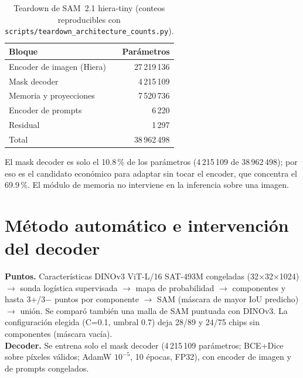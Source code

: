\documentclass[conference]{IEEEtran}
\begin{document}
\begin{table}[!t]\centering\footnotesize\caption{Teardown de SAM~2.1 hiera-tiny (conteos reproducibles con \texttt{scripts/teardown\_architecture\_counts.py}).}
\begin{tabular}{@{}lr@{}}\toprule
Bloque & Par\'ametros\\\midrule
Encoder de imagen (Hiera) & 27\,219\,136\\
Mask decoder & 4\,215\,109\\
Memoria y proyecciones & 7\,520\,736\\
Encoder de prompts & 6\,220\\
Residual & 1\,297\\\midrule
Total & 38\,962\,498\\\bottomrule
\end{tabular}\end{table}
El mask decoder es solo el 10.8\,\% de los par\'ametros (4\,215\,109 de 38\,962\,498); por eso es el candidato econ\'omico para adaptar sin tocar el encoder, que concentra el 69.9\,\%. El m\'odulo de memoria no interviene en la inferencia sobre una imagen.

\section{M\'etodo autom\'atico e intervenci\'on del decoder}
\textbf{Puntos.} Caracter\'isticas DINOv3 ViT-L/16 SAT-493M congeladas (32$\times$32$\times$1024) $\to$ sonda log\'istica supervisada $\to$ mapa de probabilidad $\to$ componentes y hasta 3+/3$-$ puntos por componente $\to$ SAM (m\'ascara de mayor IoU predicho) $\to$ uni\'on. Se compar\'o tambi\'en una malla de SAM puntuada con DINOv3. La configuraci\'on elegida (C=0.1, umbral 0.7) deja 28/89 y 24/75 chips sin componentes (m\'ascara vac\'ia).\\
\textbf{Decoder.} Se entrena solo el mask decoder (4\,215\,109 par\'ametros; BCE+Dice sobre p\'ixeles v\'alidos; AdamW $10^{-5}$, 10 \'epocas, FP32), con encoder de imagen y de prompts congelados.
\end{document}
